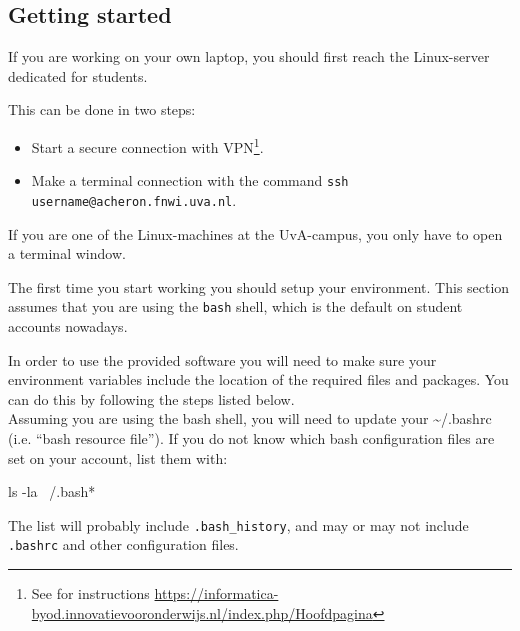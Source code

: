 \documentclass[10pt]{scrartcl}
\begin{document}
\subsection{Getting started}
\label{subsec:GettingStarted}

If you are working on your own laptop, you should first reach the Linux-server dedicated for students. 

This can be done in two steps:

\begin{itemize}
\item Start a secure connection with VPN\footnote{See for instructions \url{https://informatica-byod.innovatievooronderwijs.nl/index.php/Hoofdpagina}}.
\item Make a terminal connection with the command \texttt{ssh username@acheron.fnwi.uva.nl}.
\end{itemize}

If you are one of the Linux-machines at the UvA-campus, you only have to open a terminal window.

The first time you start working you should setup your environment.
This section assumes that you are using the {\tt bash} shell,
     which is the default on student accounts nowadays.

In order to use the provided software you will need to make sure your environment variables include the location of the required files and packages.
You can do this by following the steps listed below.
\\

Assuming you are using the bash shell, you will need to update your {\ttfamily\small
\~{}/.bashrc} (i.e. ``bash resource file'').
If you do not know which bash configuration files are set on your account,
   list them with:
\begin{verbatimtab}
ls -la ~/.bash*
\end{verbatimtab}
The list will probably include {\tt .bash\_history}, and may or may not
include {\tt .bashrc} and other configuration files.
\end{document}
